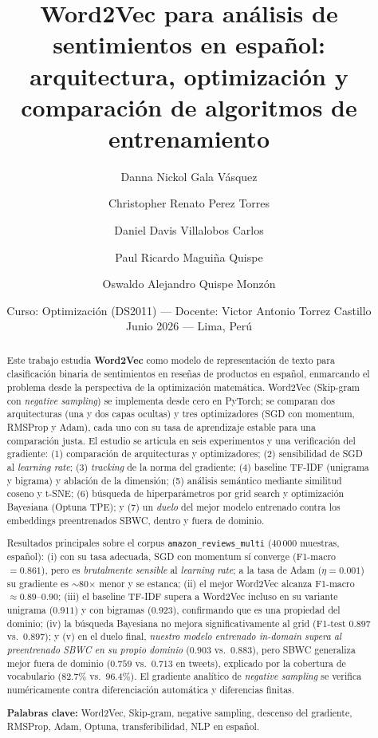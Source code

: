 \documentclass[11pt]{article}
\title{\textbf{Word2Vec para análisis de sentimientos en español:\\
arquitectura, optimización y comparación de algoritmos de entrenamiento}}
\author{Danna Nickol Gala Vásquez \and Christopher Renato Perez Torres \and
Daniel Davis Villalobos Carlos \and Paul Ricardo Maguiña Quispe \and
Oswaldo Alejandro Quispe Monzón}
\date{Curso: Optimización (DS2011) --- Docente: Victor Antonio Torrez Castillo \\ Junio 2026 --- Lima, Perú}
\begin{document}
\maketitle

\begin{abstract}
Este trabajo estudia \textbf{Word2Vec} como modelo de representación de texto para
clasificación binaria de sentimientos en reseñas de productos en español, enmarcando el
problema desde la perspectiva de la optimización matemática. Word2Vec (Skip-gram con
\emph{negative sampling}) se implementa desde cero en PyTorch; se comparan dos
arquitecturas (una y dos capas ocultas) y tres optimizadores (SGD con momentum, RMSProp y
Adam), cada uno con su tasa de aprendizaje estable para una comparación justa. El estudio
se articula en seis experimentos y una verificación del gradiente: (1) comparación de
arquitecturas y optimizadores; (2) sensibilidad de SGD al \emph{learning rate}; (3)
\emph{tracking} de la norma del gradiente; (4) baseline TF-IDF (unigrama y bigrama) y
ablación de la dimensión; (5) análisis semántico mediante similitud coseno y t-SNE; (6)
búsqueda de hiperparámetros por grid search y optimización Bayesiana (Optuna TPE); y (7) un
\emph{duelo} del mejor modelo entrenado contra los embeddings preentrenados SBWC, dentro y
fuera de dominio.

Resultados principales sobre el corpus \texttt{amazon\_reviews\_multi} (40\,000 muestras,
español): (i) con su tasa adecuada, SGD con momentum sí converge (F1-macro $=0.861$), pero
es \emph{brutalmente sensible} al \emph{learning rate}; a la tasa de Adam ($\eta=0.001$) su
gradiente es $\sim$80$\times$ menor y se estanca; (ii) el mejor Word2Vec alcanza F1-macro
$\approx 0.89$--$0.90$; (iii) el baseline TF-IDF supera a Word2Vec incluso en su variante
unigrama ($0.911$) y con bigramas ($0.923$), confirmando que es una propiedad del dominio;
(iv) la búsqueda Bayesiana no mejora significativamente al grid (F1-test $0.897$ vs.\
$0.897$); y (v) en el duelo final, \emph{nuestro modelo entrenado in-domain supera al
preentrenado SBWC en su propio dominio} ($0.903$ vs.\ $0.883$), pero SBWC generaliza mejor
fuera de dominio ($0.759$ vs.\ $0.713$ en tweets), explicado por la cobertura de
vocabulario ($82.7\%$ vs.\ $96.4\%$). El gradiente analítico de \emph{negative sampling} se
verifica numéricamente contra diferenciación automática y diferencias finitas.

\medskip
\noindent\textbf{Palabras clave:} Word2Vec, Skip-gram, negative sampling, descenso del
gradiente, RMSProp, Adam, Optuna, transferibilidad, NLP en español.
\end{abstract}
\end{document}
